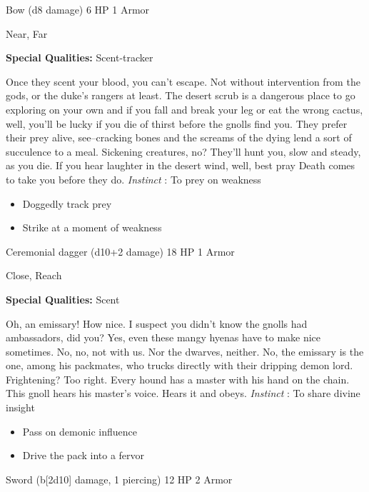 

 Bow (d8 damage) 6 HP 1 Armor


 Near, Far


 \textbf{Special Qualities:}
 Scent-tracker


 Once they scent your blood, you can't escape. Not without intervention from the gods, or the duke's rangers at least. The desert scrub is a dangerous place to go exploring on your own and if you fall and break your leg or eat the wrong cactus, well, you'll be lucky if you die of thirst before the gnolls find you. They prefer their prey alive, see--cracking bones and the screams of the dying lend a sort of succulence to a meal. Sickening creatures, no? They'll hunt you, slow and steady, as you die. If you hear laughter in the desert wind, well, best pray Death comes to take you before they do. \emph{Instinct}
: To prey on weakness
\begin{itemize}
\item Doggedly track prey
\item Strike at a moment of weakness

\end{itemize}




 Ceremonial dagger (d10+2 damage) 18 HP 1 Armor


 Close, Reach


 \textbf{Special Qualities:}
 Scent


 Oh, an emissary! How nice. I suspect you didn't know the gnolls had ambassadors, did you? Yes, even these mangy hyenas have to make nice sometimes. No, no, not with us. Nor the dwarves, neither. No, the emissary is the one, among his packmates, who trucks directly with their dripping demon lord. Frightening? Too right. Every hound has a master with his hand on the chain. This gnoll hears his master's voice. Hears it and obeys. \emph{Instinct}
: To share divine insight
\begin{itemize}
\item Pass on demonic influence
\item Drive the pack into a fervor

\end{itemize}




 Sword (b[2d10] damage, 1 piercing) 12 HP 2 Armor


